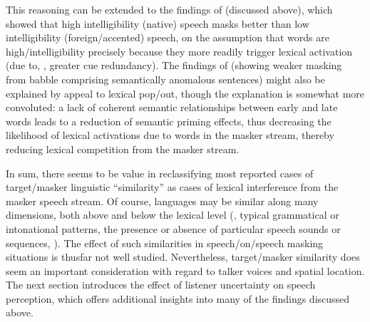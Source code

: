 This reasoning can be extended to the findings of \citealt{CalandruccioEtAl2010} (discussed above), which showed that high intelligibility (native) speech masks better than low intelligibility (foreign\-/accented) speech, on the assumption that words are high\-/intelligibility precisely because they more readily trigger lexical activation (due to, \eg, greater cue redundancy).  The findings of \citealt{BrouwerEtAl2012} (showing weaker masking from babble comprising semantically anomalous sentences) might also be explained by appeal to lexical pop\-/out, though the explanation is somewhat more convoluted: a lack of coherent semantic relationships between early and late words leads to a reduction of semantic priming effects, thus decreasing the likelihood of lexical activations due to words in the masker stream, thereby reducing lexical competition from the masker stream.  

In sum, there seems to be value in reclassifying most reported cases of target\-/masker linguistic “similarity” as cases of lexical interference from the masker speech stream.\footnotemark{}  Of course, languages may be similar along many dimensions, both above and below the lexical level (\eg, typical grammatical or intonational patterns, the presence or absence of particular speech sounds or sequences, \etc).  The effect of such similarities in speech\-/on\-/speech masking situations is thusfar not well studied.  Nevertheless, target\-/masker similarity does seem an important consideration with regard to talker voices and spatial location.  The next section introduces the effect of listener uncertainty on speech perception, which offers additional insights into many of the findings discussed above.
 
